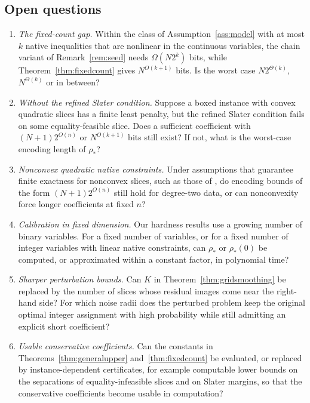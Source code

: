 \subsection*{Open questions}
\begin{enumerate}
\item \emph{The fixed-count gap.} Within the class of
 Assumption~\ref{ass:model} with at most $k$ native inequalities that are
 nonlinear in the continuous variables, the chain variant of
 Remark~\ref{rem:seed} needs $\Omega(N2^k)$ bits, while
 Theorem~\ref{thm:fixedcount} gives $N^{O(k+1)}$ bits. Is the worst case
 $N2^{\Theta(k)}$, $N^{\Theta(k)}$ or in between?
\item \emph{Without the refined Slater condition.} Suppose a boxed
 instance with convex quadratic slices has a finite least penalty, but
 the refined Slater condition fails on some equality-feasible slice. Does
 a sufficient coefficient with $(N+1)2^{O(n)}$ or $N^{O(k+1)}$ bits still
 exist? If not, what is the worst-case encoding length of $\rho_*$?
\item \emph{Nonconvex quadratic native constraints.} Under assumptions
 that guarantee finite exactness for nonconvex slices, such as those of
 \citet[Theorem~17]{LefebvreSchmidt2025}, do encoding bounds of the form
 $(N+1)2^{O(n)}$ still hold for degree-two data, or can nonconvexity force
 longer coefficients at fixed $n$?
\item \emph{Calibration in fixed dimension.} Our hardness results use a
 growing number of binary variables. For a fixed number of variables, or
 for a fixed number of integer variables with linear native constraints,
 can $\rho_*$ or $\rho_*(0)$ be computed, or approximated within a
 constant factor, in polynomial time?
\item \emph{Sharper perturbation bounds.} Can $K$ in
 Theorem~\ref{thm:gridsmoothing} be replaced by the number of slices
 whose residual images come near the right-hand side? For which noise
 radii does the perturbed problem keep the original optimal integer
 assignment with high probability while still admitting an explicit
 short coefficient?
\item \emph{Usable conservative coefficients.} Can the constants in
 Theorems~\ref{thm:generalupper} and~\ref{thm:fixedcount} be evaluated,
 or replaced by instance-dependent certificates, for example computable
 lower bounds on the separations of equality-infeasible slices and on
 Slater margins, so that the conservative coefficients become usable in
 computation?
\end{enumerate}


